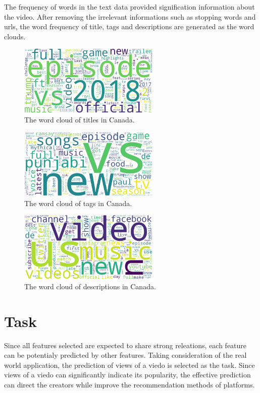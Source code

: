 \documentclass[sigplan,screen]{acmart}
\begin{document}
The frequency of words in the text data provided signification information about the video. After removing the irrelevant informations such as stopping words and urls, the word frequency of title, tags and descriptions are generated as the word clouds.
\begin{figure}[H]
  \centering
  \includegraphics[width=0.6\textwidth]{figure/CAtitleWordCloud.png} 
  \caption{The word cloud of titles in Canada.}
  \label{fig:title} 
\end{figure}
\begin{figure}[H]
  \centering
  \includegraphics[width=0.6\textwidth]{figure/CAtagsWordCloud.png}
  \caption{The word cloud of tags in Canada.}
  \label{fig:tag} 
\end{figure}
\begin{figure}[H]
  \centering
  \includegraphics[width=0.6\textwidth]{figure/CAdescriptionWordCloud.png} 
  \caption{The word cloud of descriptions in Canada.}
  \label{fig:description} 
\end{figure}

\section{Task}
Since all features selected are expected to share strong releations, each feature can be potentialy predicted by other features. Taking consideration of the real world application, the prediction of views of a viedo is selected as the task. Since views of a viedo can significantly indicate its popularity, the effective prediction can direct the creators while improve the recommendation methods of platforms.
\end{document}
